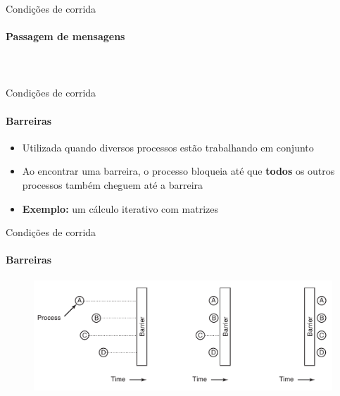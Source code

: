 \documentclass{beamer}
\begin{document}
\begin{frame}{Condições de corrida}
	\framesubtitle{Passagem de mensagens}
	\begin{columns}
		\begin{column}{0.5\textwidth}
			\inputminted[lastline=13,fontsize=\footnotesize]{c}{resources/messagepassing.c}
		\end{column}
		\begin{column}{0.5\textwidth}
			\inputminted[firstline=15,fontsize=\footnotesize]{c}{resources/messagepassing.c}
		\end{column}
	\end{columns}
\end{frame}
\begin{frame}{Condições de corrida}
	\framesubtitle{Barreiras}
	\begin{itemize}
		\item Utilizada quando diversos processos estão trabalhando em conjunto
		\item Ao encontrar uma barreira, o processo bloqueia até que \textbf{todos} os outros processos também cheguem até a barreira
		\item \textbf{Exemplo:} um cálculo iterativo com matrizes
	\end{itemize}
\end{frame}
\begin{frame}{Condições de corrida}
	\framesubtitle{Barreiras}
	\begin{figure}
		\includegraphics[width=0.9\paperwidth]{resources/barreira}
	\end{figure}
\end{frame}
\end{document}
